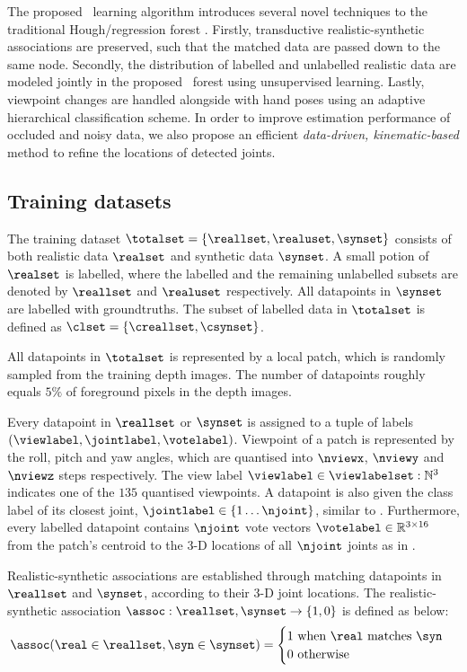 The proposed \STR\ learning algorithm introduces several novel techniques to the traditional Hough/regression forest \cite{Gall2011}. 
Firstly, transductive realistic-synthetic associations are preserved, such that the matched data are passed down to the same node.
Secondly, the distribution of labelled and unlabelled realistic data are modeled jointly in the proposed \STR\ forest using unsupervised learning. 
Lastly, viewpoint changes are handled alongside with hand poses using an adaptive hierarchical classification scheme.
In order to improve estimation performance of occluded and noisy data, we also propose an efficient \emph{data-driven, kinematic-based} method to refine the locations of detected joints.

\subsection{Training datasets}

The training dataset $\totalset = \{\reallset, \realuset, \synset\}$ consists of both realistic data $\realset$ and synthetic data $\synset$. 
A small potion of $\realset$ is labelled, where the labelled and the remaining unlabelled subsets are denoted by $\reallset$ and $\realuset$ respectively. All datapoints in $\synset$ are labelled with groundtruths. The subset of labelled data in $\totalset$ is defined as $\clset = \{\creallset, \csynset\}$.  

All datapoints in $\totalset$ is represented by a local patch, which is randomly sampled from the training depth images. The number of datapoints roughly equals $5\%$ of foreground pixels in the depth images. 

Every datapoint in $\reallset$ or $\synset$ is assigned to a tuple of labels $( \viewlabel, \jointlabel, \votelabel)$. Viewpoint of a patch is represented by the roll, pitch and yaw angles, which are quantised into $\nviewx$, $\nviewy$ and $\nviewz$ steps respectively. The view label $\viewlabel \in \viewlabelset:\mathbb{N}^{3}$ indicates one of the $135$ quantised viewpoints. A datapoint is also given the class label of its closest joint, $\jointlabel \in \{1\dots\njoint\}$, similar to \cite{Shotton2011}.   
Furthermore, every labelled datapoint contains $\njoint$ vote vectors $\votelabel \in \mathbb{R}^{3\times16}$ from the patch's centroid to the 3-D locations of all $\njoint$ joints as in \cite{Gall2011}. 

Realistic-synthetic associations are established through matching datapoints in $\reallset$ and $\synset$, according to their 3-D joint locations.  The realistic-synthetic association $\assoc: \reallset,\synset \rightarrow \{1,0\}$ is defined as below:
\begin{equation}
	\assoc(\real \in \reallset, \syn \in \synset) =
		\begin{cases}
			1 \mbox{ when $\real$ matches $\syn$} \\
			0 \mbox{ otherwise}
		\end{cases}
	\label{eq:association}
\end{equation}

